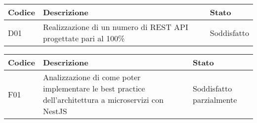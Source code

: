 \begin{table}[H]
    \begin{tabular}{|p{1.5cm}|p{7.7cm}|p{2cm}|} 
    \hline
    \textbf{Codice} & \textbf{Descrizione} & \textbf{Stato} \\ 
    \hline
    D01 & Realizzazione di un numero di REST API progettate pari al 100\%  & Soddisfatto \\
    \hline
    \end{tabular}
\end{table}
\begin{table}[H]
    \begin{tabular}{|p{1.5cm}|p{7.7cm}|p{2cm}|} 
    \hline
    \textbf{Codice} & \textbf{Descrizione} & \textbf{Stato} \\ 
    \hline
    F01 & Analizzazione di come poter implementare le best practice dell'architettura a microservizi con NestJS & Soddisfatto parzialmente \\
    \hline
    \end{tabular}
\end{table}

